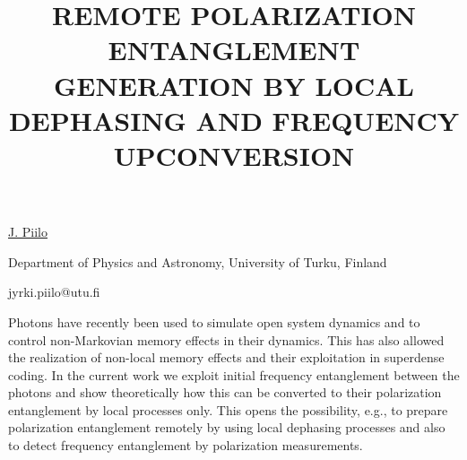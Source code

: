 \title{REMOTE POLARIZATION ENTANGLEMENT GENERATION BY LOCAL DEPHASING AND FREQUENCY UPCONVERSION}

\underline{J. Piilo} 

{\normalsize{\vspace{-4mm}
Department of Physics and Astronomy, University of Turku, Finland

\email jyrki.piilo@utu.fi}}

Photons have recently been used to simulate open system dynamics and to control non-Markovian memory effects in their dynamics. This has also allowed the realization of non-local memory effects and their exploitation in superdense coding. In the current work we exploit initial frequency entanglement between the photons and show theoretically how this can be converted to their polarization entanglement by local processes only. This opens the possibility, e.g., to prepare polarization entanglement remotely by using local dephasing processes and also to detect frequency entanglement by polarization measurements.

\vspace{\baselineskip} 